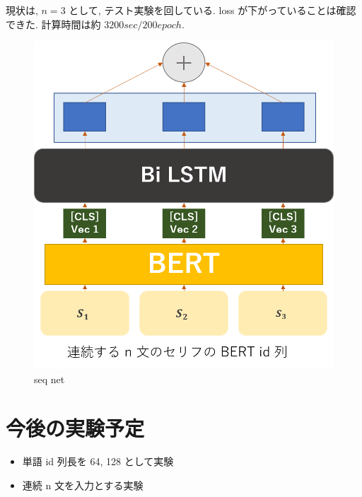 \documentclass[twocolumn]{jarticle}     %
\begin{document}
現状は, $n = 3$ として, テスト実験を回している. loss が下がっていることは確認できた.
計算時間は約 $3200 sec / 200 epoch$.

\begin{figure}[!hb]
  \begin{center}
    \includegraphics[scale=0.25]{net.png}
    \caption{seq net} %
    \label{fig:net} %
  \end{center}
\end{figure}

\newpage

\section{今後の実験予定}
\begin{itemize}
  \item 単語 id 列長を 64, 128 として実験
  \item 連続 n 文を入力とする実験
\end{itemize}



\end{document}
